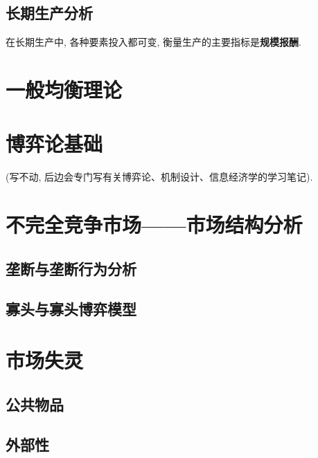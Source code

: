 \documentclass[lang=cn,10pt]{elegantbook}
\begin{document}
\section{长期生产分析}
在长期生产中, 各种要素投入都可变, 衡量生产的主要指标是\textbf{规模报酬}.
\chapter{一般均衡理论}

\chapter{博弈论基础}
(写不动, 后边会专门写有关博弈论、机制设计、信息经济学的学习笔记).
\chapter{不完全竞争市场——市场结构分析}
\section{垄断与垄断行为分析}
\section{寡头与寡头博弈模型}
\chapter{市场失灵}
\section{公共物品}
\section{外部性}
\end{document}
